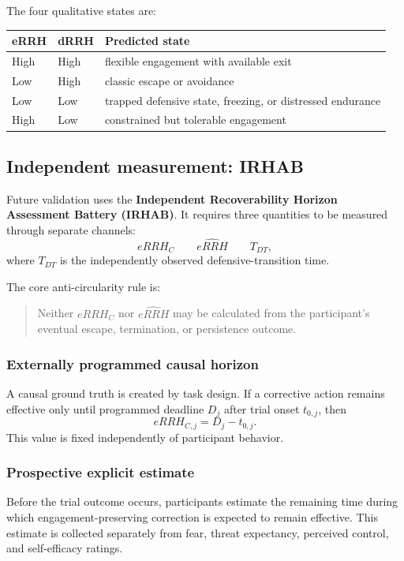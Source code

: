 \documentclass[11pt]{article}
\begin{document}
The four qualitative states are:
\begin{center}
\begin{tabular}{lll}
\toprule
eRRH & dRRH & Predicted state \\
\midrule
High & High & flexible engagement with available exit \\
Low & High & classic escape or avoidance \\
Low & Low & trapped defensive state, freezing, or distressed endurance \\
High & Low & constrained but tolerable engagement \\
\bottomrule
\end{tabular}
\end{center}

\subsection{Independent measurement: IRHAB}
Future validation uses the \textbf{Independent Recoverability Horizon Assessment Battery (IRHAB)}. It requires three quantities to be measured through separate channels:
\[
\boxed{eRRH_C}\qquad\boxed{\widehat{eRRH}}\qquad\boxed{T_{DT}},
\]
where $T_{DT}$ is the independently observed defensive-transition time.

The core anti-circularity rule is:
\begin{quote}
Neither $eRRH_C$ nor $\widehat{eRRH}$ may be calculated from the participant's eventual escape, termination, or persistence outcome.
\end{quote}

\subsubsection{Externally programmed causal horizon}
A causal ground truth is created by task design. If a corrective action remains effective only until programmed deadline $D_j$ after trial onset $t_{0,j}$, then
\[
eRRH_{C,j}=D_j-t_{0,j}.
\]
This value is fixed independently of participant behavior.

\subsubsection{Prospective explicit estimate}
Before the trial outcome occurs, participants estimate the remaining time during which engagement-preserving correction is expected to remain effective. This estimate is collected separately from fear, threat expectancy, perceived control, and self-efficacy ratings.
\end{document}
